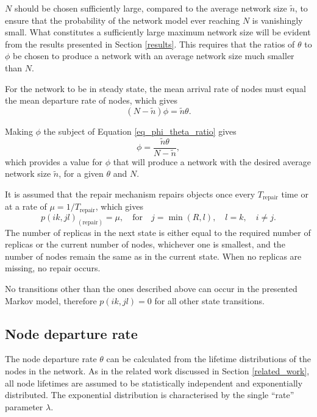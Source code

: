 $N$ should be chosen sufficiently large, compared to the average network size $\tilde{n}$, to ensure that the probability of the network model ever reaching $N$ is vanishingly small. What constitutes a sufficiently large maximum network size will be evident from the results presented in Section \ref{results}. This requires that the ratios of $\theta$ to $\phi$ be chosen to produce a network with an average network size much smaller than $N$.

For the network to be in steady state, the mean arrival rate of nodes must equal the mean departure rate of nodes, which gives
%
\begin{equation}
    (N - \tilde{n})\phi = \tilde{n}\theta.\label{eq_phi_theta_ratio}
\end{equation}

Making $\phi$ the subject of Equation \eqref{eq_phi_theta_ratio} gives
%
\begin{equation}
    \phi = \frac{\tilde{n}\theta}{N - \tilde{n}},\label{eq_phi}
\end{equation}
%
which provides a value for $\phi$ that will produce a network with the desired average network size $\tilde{n}$, for a given $\theta$ and $N$.

It is assumed that the repair mechanism repairs objects once every $T_{\textrm{repair}}$ time or at a rate of $\mu = 1/T_{\textrm{repair}}$, which gives
%
\begin{equation} \label{eq_repair}
    p(i k,j l)_{(\textrm{repair})} = \mu,\quad\textrm{for}\quad j = \min(R, l),\quad l = k,\quad i \neq j.
\end{equation}
%
The number of replicas in the next state is either equal to the required number of replicas or the current number of nodes, whichever one is smallest, and the number of nodes remain the same as in the current state. When no replicas are missing, no repair occurs.

No transitions other than the ones described above can occur in the presented Markov model, therefore $p(i k,j l) = 0$ for all other state transitions.

\subsection{Node departure rate}
\label{node_departure_rate}

The node departure rate $\theta$ can be calculated from the lifetime distributions of the nodes in the network. As in the related work discussed in Section \ref{related_work}, all node lifetimes are assumed to be statistically independent and exponentially distributed. The exponential distribution is characterised by the single ``rate'' parameter $\lambda$.

